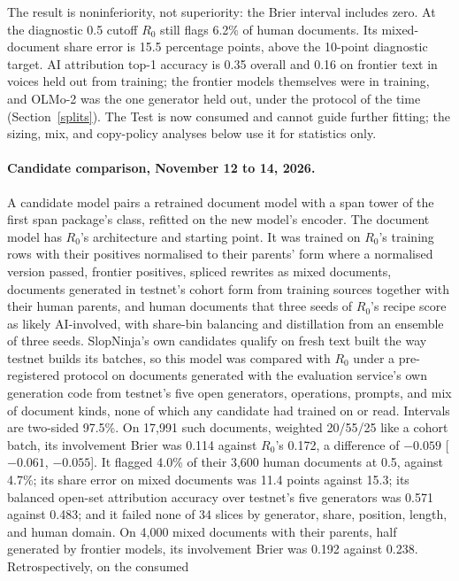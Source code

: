 The result is noninferiority, not superiority: the Brier interval includes
zero. At the diagnostic 0.5 cutoff \(R_0\) still flags 6.2\% of
human documents. Its mixed-document share error is 15.5 percentage points,
above the 10-point diagnostic target. AI attribution top-1 accuracy is 0.35
overall and 0.16 on frontier text in voices held out from training; the
frontier models themselves were in training, and OLMo-2 was the one generator
held out, under the protocol of the time (Section~\ref{splits}). The Test is now
consumed and cannot guide further fitting; the sizing, mix, and copy-policy
analyses below use it for statistics only.

\paragraph{Candidate comparison, November 12 to 14, 2026.}\label{next-reference-evidence}
A candidate model pairs a retrained
document model with a span tower of the first span package's class, refitted on
the new model's encoder. The document model has \(R_0\)'s architecture and
starting point. It was trained on \(R_0\)'s training rows with their positives
normalised to their parents' form where a normalised version passed, frontier
positives, spliced rewrites as mixed documents, documents generated in
testnet's cohort form from training sources together with their human parents,
and human documents that three seeds of \(R_0\)'s recipe score as likely
AI-involved, with share-bin balancing and distillation from an ensemble of
three seeds.
SlopNinja's own candidates qualify on fresh text built the way testnet builds
its batches, so this model was compared with \(R_0\) under a pre-registered
protocol on documents generated with the evaluation service's own generation
code from testnet's five open generators, operations, prompts, and mix of
document kinds, none of which any candidate had trained on or read. Intervals
are two-sided 97.5\%. On 17,991 such documents, weighted 20/55/25 like a
cohort batch, its involvement Brier was 0.114 against \(R_0\)'s 0.172, a
difference of \(-0.059\) [\(-0.061\), \(-0.055\)]. It flagged 4.0\% of their
3,600 human documents at 0.5, against 4.7\%; its share error on mixed
documents was 11.4 points against 15.3; its balanced open-set attribution
accuracy over testnet's five generators was 0.571 against 0.483; and it failed
none of 34 slices by generator, share, position, length, and human domain. On
4,000 mixed documents with their parents, half generated by frontier models,
its involvement Brier was 0.192 against 0.238. Retrospectively, on the consumed
